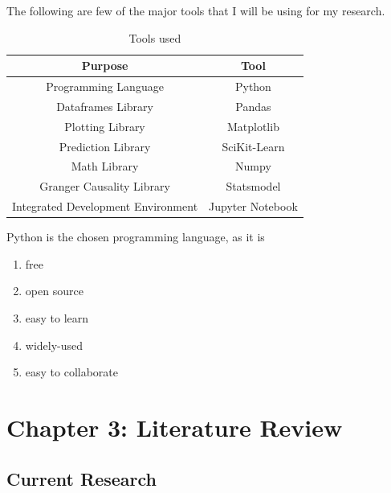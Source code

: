 \documentclass[
  english,
  doc,floatsintext]{apa6}
\providecommand{\tightlist}{%
  \setlength{\itemsep}{0pt}\setlength{\parskip}{0pt}}
\begin{document}
The following are few of the major tools that I will be using for my research.

\begin{table}[H]
  \begin{center}
  \begin{tabular}{|c|c|}
  \hline
  \textbf{Purpose}                   & \textbf{Tool}    \\ \hline
  Programming Language               & Python           \\ \hline
  Dataframes Library                 & Pandas           \\ \hline
  Plotting Library                   & Matplotlib       \\ \hline
  Prediction Library                 & SciKit-Learn     \\ \hline
  Math Library                       & Numpy            \\ \hline
  Granger Causality Library          & Statsmodel       \\ \hline
  Integrated Development Environment & Jupyter Notebook \\ \hline
  \end{tabular}
  \end{center}
  
  \captionsetup{justification=centering}
  \caption{Tools used}
\end{table}

Python is the chosen programming language, as it is

\begin{enumerate}
\def\labelenumi{\arabic{enumi}.}
\tightlist
\item
  free
\item
  open source
\item
  easy to learn
\item
  widely-used
\item
  easy to collaborate
\end{enumerate}

\newpage

\hypertarget{chapter-3-literature-review}{%
\section{Chapter 3: Literature Review}\label{chapter-3-literature-review}}

\hypertarget{current-research}{%
\subsection{Current Research}\label{current-research}}
\end{document}
